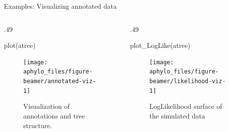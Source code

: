 \documentclass[9pt,ignorenonframetext,]{beamer}
\newenvironment{Shaded}{\begin{snugshade}}{\end{snugshade}}
\newcommand{\KeywordTok}[1]{\textcolor[rgb]{0.94,0.87,0.69}{#1}}
\newcommand{\NormalTok}[1]{\textcolor[rgb]{0.80,0.80,0.80}{#1}}
\def\begincols{\begin{columns}[T]}
\def\begincol{\begin{column}[T]}
\def\endcol{\end{column}}
\def\endcols{\end{columns}}
\begin{document}
\begin{frame}[fragile,c]{Examples: Visualizing annotated data}

\begincols

\begincol{.49\textwidth}

\footnotesize

\begin{Shaded}
\begin{Highlighting}[]
\KeywordTok{plot}\NormalTok{(atree)}
\end{Highlighting}
\end{Shaded}

\begin{figure}

{\centering \texttt{[image: aphylo\_files/figure-beamer/annotated-viz-1]} 

}

\caption{Visualization of annotations and tree structure.}\label{fig:annotated-viz}
\end{figure}

\normalsize

\endcol

\begincol{.49\textwidth}

\footnotesize

\begin{Shaded}
\begin{Highlighting}[]
\KeywordTok{plot_LogLike}\NormalTok{(atree)}
\end{Highlighting}
\end{Shaded}

\begin{figure}

{\centering \texttt{[image: aphylo\_files/figure-beamer/likelihood-viz-1]} 

}

\caption{LogLikelihood surface of the simulated data}\label{fig:likelihood-viz}
\end{figure}

\normalsize

\endcol

\endcols

\end{frame}
\end{document}
